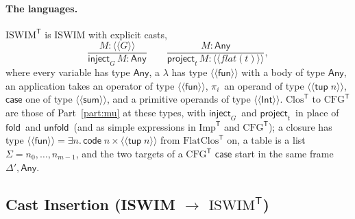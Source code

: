 \documentclass[10pt]{article}
\theoremstyle{acmplain}
\newcommand{\key}[1]{\mathsf{#1}}
\newcommand{\prj}[1]{\pi_{#1}\,}
\newcommand{\Tl}[1]{\textrm{#1}^{\mathsf{T}}}  %
\newcommand{\TAny}{\key{Any}}
\newcommand{\Tflat}[1]{\langle\!\langle #1 \rangle\!\rangle}  %
\newcommand{\Tcode}[1]{\key{code}\;#1}         %
\newcommand{\Tfun}{\key{fun}}                  %
\newcommand{\Tsum}{\key{sum}}                  %
\newcommand{\Ttup}[1]{\key{tup}\;#1}           %
\newcommand{\Tflatof}[1]{\mathit{flat}(#1)}    %
\newcommand{\Tinject}[1]{\key{inject}_{#1}\,}
\newcommand{\Tproject}[1]{\key{project}_{#1}\,}
\newcommand{\Mfold}{\key{fold}\,}
\newcommand{\Munfold}{\key{unfold}\,}
\begin{document}
\paragraph{The languages.} $\Tl{ISWIM}$ is ISWIM with explicit casts,
\[
  \frac{M : \Tflat{G}}{\Tinject{G} M : \TAny}
  \qquad
  \frac{M : \TAny}{\Tproject{t} M : \Tflat{\Tflatof{t}}} ,
\]
where every variable has type $\TAny$, a $\lambda$ has type
$\Tflat{\Tfun}$ with a body of type $\TAny$, an application takes an
operator of type $\Tflat{\Tfun}$, $\prj{i}$ an operand of type
$\Tflat{\Ttup{n}}$, $\key{case}$ one of type $\Tflat{\Tsum}$, and a
primitive operands of type $\Tflat{\key{Int}}$. $\Tl{Clos}$ to $\Tl{CFG}$
are those of Part~\ref{part:mu} at these types, with $\Tinject{G}$ and
$\Tproject{t}$ in place of $\Mfold$ and $\Munfold$ (and as simple
expressions in $\Tl{Imp}$ and $\Tl{CFG}$); a closure has type
$\Tflat{\Tfun} = \exists n.\, \Tcode{n} \times \Tflat{\Ttup{n}}$ from
$\Tl{FlatClos}$ on, a table is a list $\Sigma = n_0, \ldots, n_{m-1}$, and the two
targets of a $\Tl{CFG}$ $\key{case}$ start in the same frame $\Delta', \TAny$.

\subsection{Cast Insertion (ISWIM \texorpdfstring{$\to$}{->} \texorpdfstring{$\Tl{ISWIM}$}{ISWIM-T})}\label{sec:t-cast}
\end{document}
